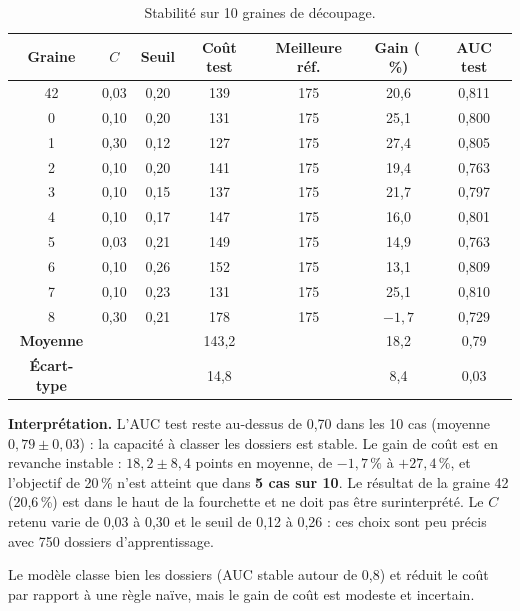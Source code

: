 \documentclass[10.5pt,a4paper]{article}
\newcommand{\pc}{\,\%}
\begin{document}
\begin{table}[H]\centering\small
\caption{Stabilité sur 10 graines de découpage.}
\begin{tabular}{@{}c c c c c c c@{}}
\toprule
\textbf{Graine} & $C$ & \textbf{Seuil} & \textbf{Coût test} & \textbf{Meilleure réf.} & \textbf{Gain (\pc)} & \textbf{AUC test}\\\midrule
42 & 0,03 & 0,20 & 139 & 175 & 20,6 & 0,811\\
0 & 0,10 & 0,20 & 131 & 175 & 25,1 & 0,800\\
1 & 0,30 & 0,12 & 127 & 175 & 27,4 & 0,805\\
2 & 0,10 & 0,20 & 141 & 175 & 19,4 & 0,763\\
3 & 0,10 & 0,15 & 137 & 175 & 21,7 & 0,797\\
4 & 0,10 & 0,17 & 147 & 175 & 16,0 & 0,801\\
5 & 0,03 & 0,21 & 149 & 175 & 14,9 & 0,763\\
6 & 0,10 & 0,26 & 152 & 175 & 13,1 & 0,809\\
7 & 0,10 & 0,23 & 131 & 175 & 25,1 & 0,810\\
8 & 0,30 & 0,21 & 178 & 175 & $-1{,}7$ & 0,729\\\midrule
\textbf{Moyenne} & & & 143,2 & & 18,2 & 0,79\\
\textbf{Écart-type} & & & 14,8 & & 8,4 & 0,03\\
\bottomrule
\end{tabular}
\end{table}
\textbf{Interprétation.} L'AUC test reste au-dessus de 0,70 dans les 10 cas (moyenne $0{,}79\pm0{,}03$) : la capacité à classer les dossiers est stable. Le gain de coût est en revanche instable : $18{,}2\pm8{,}4$ points en moyenne, de $-1{,}7\pc{}$ à $+27{,}4\pc$, et l'objectif de 20\pc{} n'est atteint que dans \textbf{5 cas sur 10}. Le résultat de la graine 42 (20,6\pc) est dans le haut de la fourchette et ne doit pas être surinterprété. Le $C$ retenu varie de 0,03 à 0,30 et le seuil de 0,12 à 0,26 : ces choix sont peu précis avec 750 dossiers d'apprentissage.

\begin{retenir}
Le modèle classe bien les dossiers (AUC stable autour de 0,8) et réduit le coût par rapport à une règle naïve, mais le gain de coût est modeste et incertain.
\end{retenir}

\end{document}
